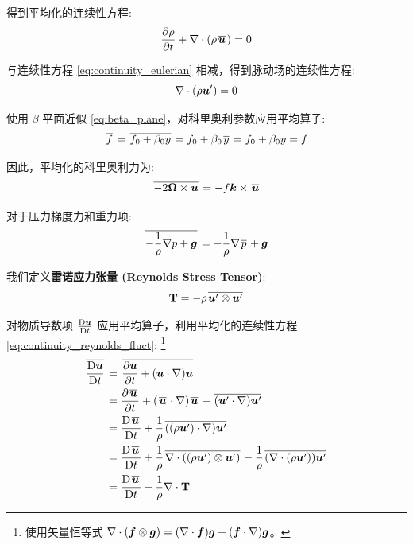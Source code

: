 得到平均化的连续性方程:
\begin{equation}
    \pde{\density}{\timevar} + \nabla \cdot (\density\mean{\vel}) = 0
    \label{eq:continuity_reynolds}
\end{equation}

与连续性方程 \eqref{eq:continuity_eulerian} 相减，得到脉动场的连续性方程:
\begin{equation}
    \nabla \cdot (\rho \bm{u}') = 0
    \label{eq:continuity_reynolds_fluct}
\end{equation}

使用 $\beta$ 平面近似 \eqref{eq:beta_plane}，对科里奥利参数应用平均算子:
\begin{equation}
    \mkern2mu \overline{f} \mkern2mu = \mkern2mu \overline{f_0 + \beta_0 y} \mkern2mu = f_0 + \beta_0 \mkern2mu \overline{y} \mkern2mu = f_0 + \beta_0 y = f
    \label{eq:coriolis_mean}
\end{equation}

因此，平均化的科里奥利力为:
\begin{equation}
    \mkern2mu \overline{-2\bm{\Omega} \times \bm{u}} \mkern2mu = -f \bm{k} \times \mkern2mu \overline{\bm{u}} \mkern2mu
    \label{eq:coriolis_op_mean}
\end{equation}

对于压力梯度力和重力项:
\begin{equation}
    \mkern2mu \overline{-\frac{1}{\rho} \nabla p + \bm{g}} \mkern2mu = -\frac{1}{\rho} \nabla \mkern2mu \overline{p} \mkern2mu + \bm{g}
    \label{eq:pressure_gradient_gravity_mean}
\end{equation}

我们定义\textbf{雷诺应力张量 (Reynolds Stress Tensor)}:
\begin{equation}
    \mathbf{T} = -\rho \mkern2mu \overline{\bm{u}' \otimes \bm{u}'} \mkern2mu
    \label{eq:reynolds_stress_tensor}
\end{equation}

对物质导数项 $\frac{\mathrm{D} \bm{u}}{\mathrm{D} t}$ 应用平均算子，利用平均化的连续性方程 \eqref{eq:continuity_reynolds_fluct}:
\footnote{使用矢量恒等式 $\nabla \cdot (\bm{f} \otimes \bm{g}) = (\nabla \cdot \bm{f}) \bm{g} + (\bm{f} \cdot \nabla) \bm{g}$。}
\begin{align*}
    \mean{\matderiv{\vel}} &= \mean{\pde{\vel}{\timevar} + (\vel \cdot \nabla)\vel} \\
    &= \pde{\mean{\vel}}{\timevar} + (\mean{\vel} \cdot \nabla) \mean{\vel} + \mean{(\fluct{\vel} \cdot \nabla) \fluct{\vel}} \\
    &= \matderiv{\mean{\vel}} + \frac{1}{\density} \mean{((\density \fluct{\vel}) \cdot \nabla) \fluct{\vel}} \\
    &= \matderiv{\mean{\vel}} + \frac{1}{\density} \mean{\nabla \cdot ((\density \fluct{\vel}) \otimes \fluct{\vel})} - \frac{1}{\density} \mean{(\nabla \cdot (\density \fluct{\vel})) \fluct{\vel}} \\
    &= \matderiv{\mean{\vel}} - \frac{1}{\density} \nabla \cdot \reynoldsstress
\end{align*}

